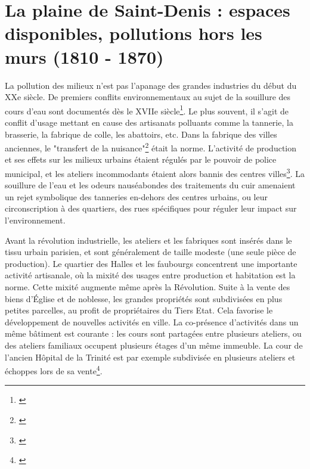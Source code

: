 \documentclass[a4paper,twoside,12pt]{book}
\begin{document}
\section{La plaine de Saint-Denis : espaces disponibles, pollutions hors les murs (1810 - 1870)}

La pollution des milieux n'est pas l'apanage des grandes industries du début du XXe siècle. De premiers conflits environnementaux au sujet de la souillure des cours d'eau sont documentés dès le XVIIe siècle\footnote{\cite{bernhardt_demon_2002}}. Le plus souvent, il s'agit de conflit d'usage mettant en cause des artisanats polluants comme la tannerie, la brasserie, la fabrique de colle, les abattoirs, etc. Dans la fabrique des villes anciennes, le "transfert de la nuisance"\footnote{\cite{fressoz_decret_2011}} était la norme. L'activité de production et ses effets sur les milieux urbains étaient régulés par le pouvoir de police municipal, et les ateliers incommodants étaient alors bannis des centres villes\footnote{\cite{fressoz_decret_2011}}. La souillure de l'eau et les odeurs nauséabondes des traitements du cuir amenaient un rejet symbolique des tanneries en-dehors des centres urbains, ou leur circonscription à des quartiers, des rues spécifiques pour réguler leur impact sur l'environnement. 

Avant la révolution industrielle, les ateliers et les fabriques sont insérés dans le tissu urbain parisien, et sont généralement de taille modeste (une seule pièce de production). Le quartier des Halles et les faubourgs concentrent une importante activité artisanale, où la mixité des usages entre production et habitation est la norme. Cette mixité augmente même après la Révolution. Suite à la vente des biens d'Église et de noblesse, les grandes propriétés sont subdivisées en plus petites parcelles, au profit de propriétaires du Tiers Etat. Cela favorise le développement de nouvelles activités en ville. La co-présence d'activités dans un même bâtiment est courante : les cours sont partagées entre plusieurs ateliers, ou des ateliers familiaux occupent plusieurs étages d'un même immeuble. La cour de l'ancien Hôpital de la Trinité est par exemple subdivisée en plusieurs ateliers et échoppes lors de sa vente\footnote{\cite{gribaudi_ruptures_2009}}.  
\end{document}
